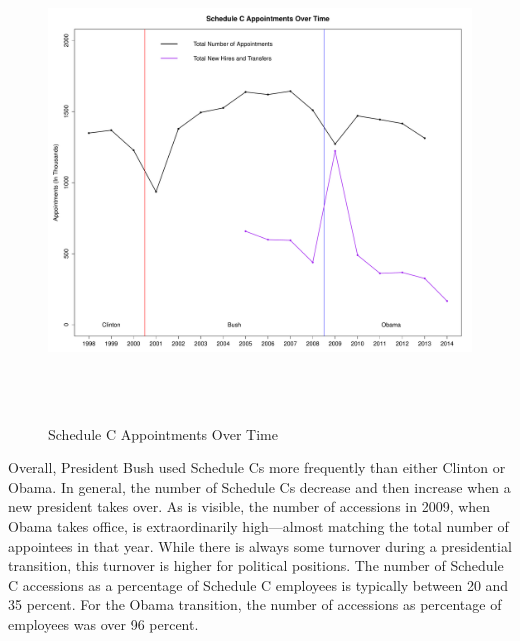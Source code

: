\documentclass[12pt]{article}
\begin{document}
\begin{figure}[!htb]
\begin{center}
\includegraphics[height=5in,width=7in]{SCAptsandAccOverTime.pdf}
\caption{Schedule C Appointments Over Time}
\end{center}
\end{figure}

Overall, President Bush used Schedule Cs more frequently than either Clinton or Obama. In general, the number of Schedule Cs decrease and then increase when a new president takes over. As is visible, the number of accessions in 2009, when Obama takes office, is extraordinarily high---almost matching the total number of appointees in that year. While there is always some turnover during a presidential transition, this turnover is higher for political positions. The number of Schedule C accessions as a percentage of Schedule C employees is typically between 20 and 35 percent. For the Obama transition, the number of accessions as percentage of employees was over 96 percent.

\end{document}
